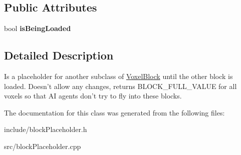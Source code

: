 \subsection*{\-Public \-Attributes}
\begin{DoxyCompactItemize}
\item 
\hypertarget{classVoxelBlockPlaceholder_a59ec484ff8323f1a8826aa23a199f830}{
bool {\bfseries is\-Being\-Loaded}}
\label{d0/def/classVoxelBlockPlaceholder_a59ec484ff8323f1a8826aa23a199f830}

\end{DoxyCompactItemize}


\subsection{\-Detailed \-Description}
\-Is a placeholder for another subclass of \hyperlink{classVoxelBlock}{\-Voxel\-Block} until the other block is loaded. \-Doesn't allow any changes, returns \-B\-L\-O\-C\-K\-\_\-\-F\-U\-L\-L\-\_\-\-V\-A\-L\-U\-E for all voxels so that \-A\-I agents don't try to fly into these blocks. 

\-The documentation for this class was generated from the following files\-:\begin{DoxyCompactItemize}
\item 
include/block\-Placeholder.\-h\item 
src/block\-Placeholder.\-cpp\end{DoxyCompactItemize}

